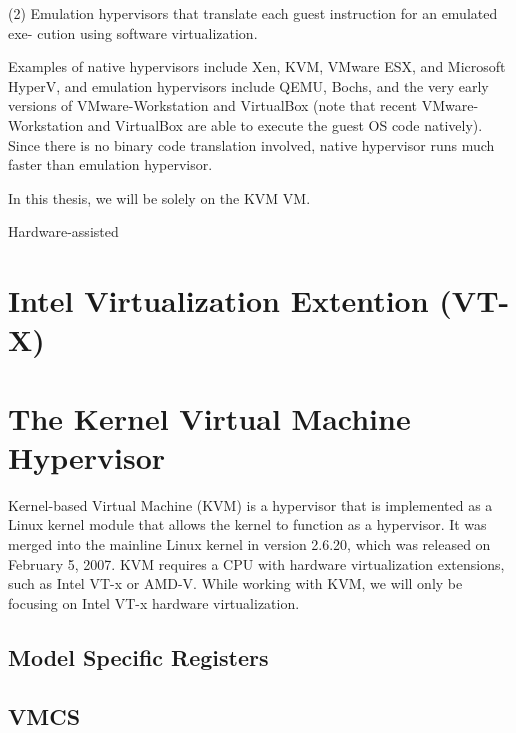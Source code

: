 \documentclass{report}
\begin{document}
\begin{spacing}{1.5}
{\large
(2) Emulation hypervisors that translate each guest instruction for an emulated exe-
cution using software virtualization.
\newline
}

{\large
Examples of native hypervisors include Xen, KVM, VMware ESX, and Microsoft HyperV, and emulation hypervisors include QEMU, Bochs, and the very early versions of
VMware-Workstation and VirtualBox (note that recent VMware-Workstation and VirtualBox are able to execute the guest OS code natively). Since there is no binary code
translation involved, native hypervisor runs much faster than emulation hypervisor.

In this thesis, we will be solely on the KVM VM.








Hardware-assisted




}













\section{Intel Virtualization Extention (VT-X)}
\section{The Kernel Virtual Machine Hypervisor}


{\large 
Kernel-based Virtual Machine (KVM) is a hypervisor that is implemented as a Linux kernel module that allows the kernel to function as a hypervisor. It was merged into the mainline Linux kernel in version 2.6.20, which was released on February 5, 2007. KVM requires a CPU with hardware virtualization extensions, such as Intel VT-x or AMD-V. While working with KVM, we will only be focusing on Intel VT-x hardware virtualization.
\newline
}



\subsection{Model Specific Registers}
\subsection{VMCS}

\end{spacing}
\end{document}

